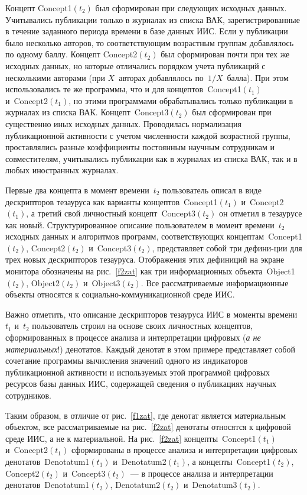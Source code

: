 \begin{multicols}{2}
   Концепт Concept1$(t_2)$ был сформирован при следующих исходных данных. 
Учитывались пуб\-ли\-ка\-ции только в журналах из списка ВАК, зарегистрированные в течение 
заданного периода времени в базе данных ИИС. Если у публикации было несколько авторов, 
то соответствующим возрастным группам добавлялось по одному баллу. Концепт 
Concept2$(t_2)$ был сформирован почти при тех же исходных данных, но которые 
отличались порядком учета публикаций с несколькими авторами (при $X$~авторах 
добавлялось по~$1/X$~балла). При этом использовались те же программы, что и для 
концептов~Concept1$(t_1)$ и~Concept2$(t_1)$, но этими программами обрабатывались только 
публикации в журналах из списка ВАК. Концепт~Concept3$(t_2)$ был сформирован при 
существенно иных исходных данных. Проводилась нормализация публикационной 
активности с учетом численности каждой воз\-раст\-ной группы, проставлялись разные 
коэффициенты постоянным научным сотрудникам и совместителям, учитывались 
публикации как в журналах из списка ВАК, так и в любых иностранных жур\-налах.
{ %

}
   
   Первые два концепта в момент времени~$t_2$ пользователь описал в виде дескрипторов 
тезауруса как варианты концептов~Concept1$(t_1)$ и~Concept2$(t_1)$, а третий свой личностный 
концепт~Concept3$(t_2)$ он отметил в тезаурусе как новый. Структурированное описание 
пользователем в момент времени~$t_2$ исходных данных и алгоритмов программ, 
соответствующих концептам~Concept1$(t_2)$, Concept2$(t_2)$ и~Concept3$(t_2)$, 
представляет собой три дефини-\linebreak ции для  трех новых дескрипторов тезауруса. 
Отобра\-жения этих дефиниций на экране монитора обозна\-чены на рис.~\ref{f2zat} как три 
информационных объекта~Object1$(t_2)$, Object2$(t_2)$ и~Object3$(t_2)$. Все 
рассматриваемые информационные объекты относятся к социально-ком\-му\-ни\-ка\-ци\-он\-ной 
среде ИИС.
   
   Важно отметить, что описание дескрипторов тезауруса ИИС в моменты времени~$t_1$ 
и~$t_2$ пользователь строил на основе своих личностных концептов, сформированных в 
процессе анализа и интерпретации цифровых (\textit{а не материальных}!) денотатов. 
Каж\-дый денотат в этом примере представляет собой сочетание программы вычисления 
значений одного из индикаторов публикационной ак\-тив\-ности и используемых этой 
программой цифровых ресурсов базы данных ИИС, содержащей сведения о публикациях 
научных сотрудников.
\columnbreak
   
Таким образом, в отличие от рис.~\ref{f1zat}, где денотат является материальным 
объектом, все рассматриваемые на рис.~\ref{f2zat} денотаты относятся к цифровой среде 
ИИС, а не к материальной. На рис.~\ref{f2zat} концепты~Concept1$(t_1)$ и~Concept2$(t_1)$ 
сформированы в процессе анализа и интерпретации цифровых денотатов~Denotatum1$(t_1)$ 
и~Denotatum2$(t_1)$, а концепты~Concept1$(t_2)$, Concept2$(t_2) $ и~Concept3$(t_2)$~--- в 
процессе анализа и интерпретации денотатов~Denotatum1$(t_2)$, Denotatum2$(t_2)$ 
и~Denotatum3$(t_2)$.
   

\end{multicols}

